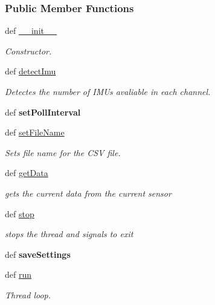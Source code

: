 \subsubsection*{Public Member Functions}
\begin{DoxyCompactItemize}
\item 
def \hyperlink{classmain_process_1_1_main_process_a96179f150cf7b4763bb7ea705036efe3}{\-\_\-\-\_\-init\-\_\-\-\_\-}
\begin{DoxyCompactList}\small\item\em Constructor. \end{DoxyCompactList}\item 
def \hyperlink{classmain_process_1_1_main_process_a05fa1ffb2d1357bdaf2cdfb4fedc5d5d}{detect\-Imu}
\begin{DoxyCompactList}\small\item\em Detectes the number of I\-M\-Us avaliable in each channel. \end{DoxyCompactList}\item 
\hypertarget{classmain_process_1_1_main_process_abee13c2eebb46c3990ed9e00e8bab243}{def {\bfseries set\-Poll\-Interval}}\label{classmain_process_1_1_main_process_abee13c2eebb46c3990ed9e00e8bab243}

\item 
def \hyperlink{classmain_process_1_1_main_process_afffc3c5095b0abab4a7c74ceb5b92fa5}{set\-File\-Name}
\begin{DoxyCompactList}\small\item\em Sets file name for the C\-S\-V file. \end{DoxyCompactList}\item 
def \hyperlink{classmain_process_1_1_main_process_ab0a345554ba8ce59d396418fc9b97121}{get\-Data}
\begin{DoxyCompactList}\small\item\em gets the current data from the current sensor \end{DoxyCompactList}\item 
def \hyperlink{classmain_process_1_1_main_process_ab0d698817a4f92499affb3742b14c03a}{stop}
\begin{DoxyCompactList}\small\item\em stops the thread and signals to exit \end{DoxyCompactList}\item 
\hypertarget{classmain_process_1_1_main_process_abf1f1b3f0452593e8e5880d9c881db84}{def {\bfseries save\-Settings}}\label{classmain_process_1_1_main_process_abf1f1b3f0452593e8e5880d9c881db84}

\item 
def \hyperlink{classmain_process_1_1_main_process_a83337e0c06f5fa02705bf309537c8702}{run}
\begin{DoxyCompactList}\small\item\em Thread loop. \end{DoxyCompactList}\end{DoxyCompactItemize}
